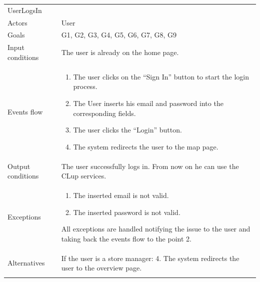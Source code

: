 \begin{longtable}[]{@{}
  >{\raggedright\arraybackslash}p{}
  >{\raggedright\arraybackslash}p{}@{}}
\toprule
UserLogsIn & \\ \addlinespace
\midrule
\endhead
Actors & User \\ \addlinespace
Goals & G1, G2, G3, G4, G5, G6, G7, G8, G9 \\ \addlinespace
Input conditions & The user is already on the home
page. \\ \addlinespace
Events flow & \begin{enumerate}\vspace{-1.35\baselineskip}
    \item The user clicks on the ``Sign In'' button to start the login process.
    \item The User inserts his email and password into the corresponding fields.
    \item The user clicks the ``Login'' button.
    \item The system redirects the user to the map page.
\vspace{-1.0\baselineskip}\end{enumerate} \\ \addlinespace
Output conditions & The user successfully logs in. From now on he can use the CLup services. \\ \addlinespace
Exceptions & \begin{enumerate}\vspace{-1.35\baselineskip}
    \item The inserted email is not valid.
    \item The inserted password is not valid.
\end{enumerate}All exceptions are handled notifying the issue to the user and taking back the events flow to the point 2. \\ \addlinespace
Alternatives & If the user is a store manager: 4. The system redirects the user to the overview page. \\ \addlinespace
\bottomrule
\end{longtable}

